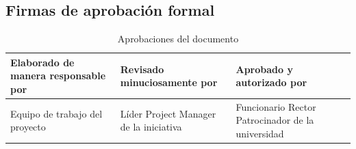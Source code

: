 \documentclass[11pt,spanish]{article}
\begin{document}
\subsection{Firmas de aprobación formal}

\begin{table}[H]
\centering
\caption{Aprobaciones del documento}\label{tab:aprobaciones}
\begin{tabularx}{\textwidth}{Y Y Y}
\toprule
\textbf{Elaborado de manera responsable por} & \textbf{Revisado minuciosamente por} & \textbf{Aprobado y autorizado por} \\
\midrule
Equipo de trabajo del proyecto & Líder Project Manager de la iniciativa & Funcionario Rector Patrocinador de la universidad \\
\bottomrule
\end{tabularx}
\end{table}
\end{document}
